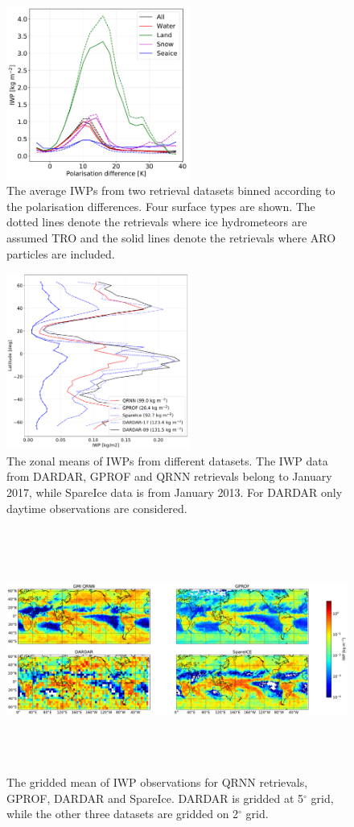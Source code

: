 \documentclass[amt, manuscript]{copernicus}
\begin{document}
\begin{figure}[t]
	\includegraphics[width=6cm]{Figures/IWP_PD_GMI.pdf}
	\caption{ The average IWPs  from two retrieval datasets binned according to the polarisation differences. Four surface types are shown. The dotted lines denote the retrievals where ice hydrometeors are assumed TRO and the solid lines denote the retrievals where ARO particles are included. }
	\label{fig:IWP_PD_GMI}
\end{figure}

\begin{figure}[t]
	\includegraphics[width=6cm]{Figures/zonal_mean_all_jan.pdf}
	\caption{ The zonal means of IWPs from different datasets. The IWP data from DARDAR, GPROF and QRNN retrievals belong to January 2017, while SpareIce data is from January 2013. For DARDAR only daytime observations are considered. }
	\label{fig:zonal_mean_GMI}
\end{figure}

\begin{figure}[t]
	\includegraphics[width=16cm, height = 8cm]{Figures/IWP_spatial_distribution.pdf}
	\caption{ The gridded mean of IWP observations for QRNN retrievals, GPROF, DARDAR and SpareIce. DARDAR is gridded at 5$^\circ$ grid, while the other three datasets are gridded on 2$^\circ$ grid. }
	\label{fig:spatial_dist_GMI}
\end{figure}
\end{document}
